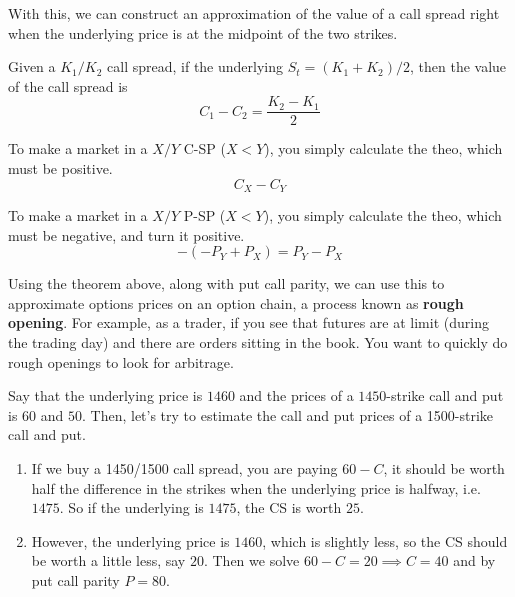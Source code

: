 \documentclass{article}
\begin{document}
    With this, we can construct an approximation of the value of a call spread right when the underlying price is at the midpoint of the two strikes. 

    \begin{corollary}
      Given a $K_1/K_2$ call spread, if the underlying $S_t = (K_1 + K_2)/2$, then the value of the call spread is 
      \begin{equation}
        C_1 - C_2  = \frac{K_2 - K_1}{2}
      \end{equation}
    \end{corollary}

    \begin{example}
      To make a market in a $X/Y$ C-SP ($X < Y$), you simply calculate the theo, which must be positive.
      \begin{equation}
        C_X - C_Y
      \end{equation}
    \end{example}

    \begin{example}
      To make a market in a $X/Y$ P-SP ($X < Y$), you simply calculate the theo, which must be negative, and turn it positive.
      \begin{equation}
        -(-P_Y + P_X) = P_Y - P_X
      \end{equation}
    \end{example}

    Using the theorem above, along with put call parity, we can use this to approximate options prices on an option chain, a process known as \textbf{rough opening}. For example, as a trader, if you see that futures are at limit (during the trading day) and there are orders sitting in the book. You want to quickly do rough openings to look for arbitrage. 

    \begin{example}
       Say that the underlying price is $1460$ and the prices of a $1450$-strike call and put is $60$ and $50$. Then, let's try to estimate the call and put prices of a 1500-strike call and put.
       \begin{enumerate}
         \item If we buy a 1450/1500 call spread, you are paying $60 - C$, it should be worth half the difference in the strikes when the underlying price is halfway, i.e. $1475$. So if the underlying is $1475$, the CS is worth $25$.
         \item However, the underlying price is $1460$, which is slightly less, so the CS should be worth a little less, say $20$. Then we solve $60 - C = 20 \implies C = 40$ and by put call parity $P = 80$.
       \end{enumerate}
    \end{example}
\end{document}
